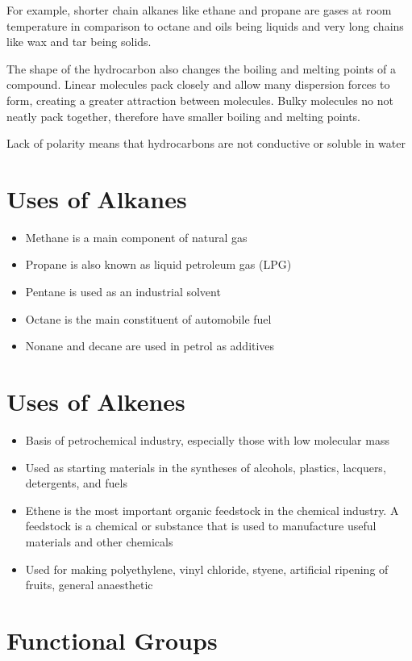	For example, shorter chain alkanes like ethane and propane are gases at room temperature in comparison to octane and oils being liquids and very long chains like wax and tar being solids.

	The shape of the hydrocarbon also changes the boiling and melting points of a compound. Linear molecules pack closely and allow many dispersion forces to form, creating a greater attraction between molecules. Bulky molecules no not neatly pack together, therefore have smaller boiling and melting points.

	Lack of polarity means that hydrocarbons are not conductive or soluble in water

\section{Uses of Alkanes}

	\begin{itemize}
		\item Methane is a main component of natural gas
		\item Propane is also known as liquid petroleum gas (LPG)
		\item Pentane is used as an industrial solvent
		\item Octane is the main constituent of automobile fuel
		\item Nonane and decane are used in petrol as additives
	\end{itemize}

\section{Uses of Alkenes}

	\begin{itemize}
		\item Basis of petrochemical industry, especially those with low molecular mass
		\item Used as starting materials in the syntheses of alcohols, plastics, lacquers, detergents, and fuels
		\item Ethene is the most important organic feedstock in the chemical industry. A feedstock is a chemical or substance that is used to manufacture useful materials and other chemicals
		\item Used for making polyethylene, vinyl chloride, styene, artificial ripening of fruits, general anaesthetic
	\end{itemize}

\section{Functional Groups}

